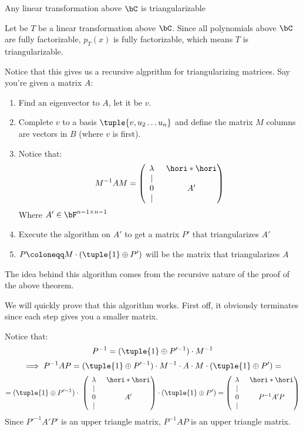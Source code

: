 \documentclass[10pt]{article}
\begin{document}
\begin{corollary}{Any linear transformation above $\bC$ is triangularizable}

Let be $T$ be a linear transformation above $\bC$. Since all polynomials above $\bC$ are fully factorizable, $p_T(x)$ is fully factorizable, which means $T$ is triangularizable.

\end{corollary}

\begin{statement}{Notice that this gives us a recursive algprithm for triangularizing matrices. Say you're given a matrix $A$:
\begin{enumerate}
    \item Find an eigenvector to $A$, let it be $v$.
    \item Complete $v$ to a basis $\tuple{v,u_2\dots u_n}$ and define the matrix $M$ columns are vectors in $B$ (where $v$ is first).
    \item Notice that:
    \[ M^{-1}AM = \begin{pmatrix} \lambda & \hori*\hori \\ \begin{array}{c}\vert\\0\\\vert\end{array} & A' \end{pmatrix} \]
    Where $A'\in\bF^{n-1\times n-1}$
    \item Execute the algorithm on $A'$ to get a matrix $P'$ that triangularizes $A'$
    \item $P\coloneqq M\cdot (\tuple{1}\oplus P')$ will be the matrix that triangularizes $A$
\end{enumerate}
\medskip}

The idea behind this algorithm comes from the recursive nature of the proof of the above theorem. 

We will quickly prove that this algorithm works. First off, it obviously terminates since each step gives you a smaller matrix. 

Notice that:
\[ P^{-1} = (\tuple{1}\oplus P'^{-1})\cdot M^{-1} \]
\[ \implies P^{-1}AP = (\tuple{1}\oplus P'^{-1})\cdot M^{-1} \cdot A \cdot M\cdot (\tuple{1}\oplus P') = \]
\[ = (\tuple{1}\oplus P'^{-1})\cdot\ \begin{pmatrix} \lambda & \hori*\hori \\ \begin{array}{c}\vert\\0\\\vert\end{array} & A' \end{pmatrix} \cdot (\tuple{1}\oplus P') = \begin{pmatrix} \lambda & \hori*\hori \\ \begin{array}{c}\vert\\0\\\vert\end{array} & P^{-1}A'P \end{pmatrix} \]
Since $P'^{-1}A'P'$ is an upper triangle matrix, $P^{-1}AP$ is an upper triangle matrix.

\end{statement}
\end{document}
